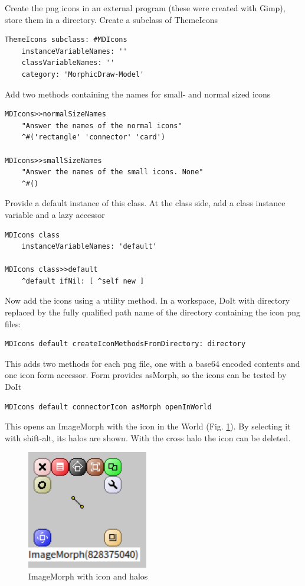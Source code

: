 \documentclass[10pt]{article}   	%
\begin{document}
Create the png icons in an external program
(these were created with Gimp), store them in a directory.
Create a subclass of ThemeIcons
\begin{verbatim}
ThemeIcons subclass: #MDIcons
    instanceVariableNames: ''
    classVariableNames: ''
    category: 'MorphicDraw-Model'
\end{verbatim}
Add two methods containing the names for small- and normal sized icons
\begin{verbatim}
MDIcons>>normalSizeNames
    "Answer the names of the normal icons"
    ^#('rectangle' 'connector' 'card')

MDIcons>>smallSizeNames
    "Answer the names of the small icons. None"
    ^#()
\end{verbatim}
Provide a default instance of this class. At the class side, add 
a class instance variable and a lazy accessor
\begin{verbatim}
MDIcons class
    instanceVariableNames: 'default'

MDIcons class>>default
    ^default ifNil: [ ^self new ]
\end{verbatim}
Now add the icons using a utility method. In a workspace, DoIt
with directory replaced by the fully qualified path name of the
directory containing the icon png files:
\begin{verbatim}
MDIcons default createIconMethodsFromDirectory: directory 
\end{verbatim}
This adds two methods for each png file, one with a base64 encoded
contents and one icon form accessor. Form provides asMorph,
so the icons can be tested by DoIt
\begin{verbatim}
MDIcons default connectorIcon asMorph openInWorld
\end{verbatim}
This opens an ImageMorph with the icon in the World (Fig. \ref{iconhalos}). 
By selecting it with shift-alt, its halos are shown. With the cross halo the icon can be deleted. 
\begin{figure}[htb]
\begin{center}
\includegraphics[width=150pt]{ImageIcon.png}
\caption{ImageMorph with icon and halos}
\label{iconhalos}
\end{center}
\end{figure}
\end{document}
